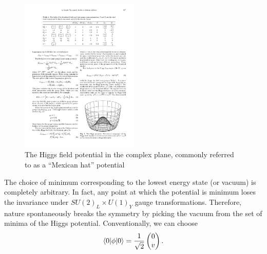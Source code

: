 \begin{figure}[!hbtp]
\centering
\includegraphics[width=0.5\textwidth]{Higgs_potential}
\caption[The Higgs field potential]{The Higgs field potential in the complex plane, commonly referred to as a
``Mexican hat'' potential \autocite{top_quark_at_HC}}
\label{fig:higgs_potential}
\end{figure}

The choice of minimum corresponding to the lowest energy state (or vacuum) is completely arbitrary. In fact, any point
at which the potential is minimum loses the invariance under $SU(2)_L \times U(1)_Y$ gauge transformations. Therefore,
nature spontaneously breaks the symmetry by picking the vacuum from the set of minima of the Higgs potential.
Conventionally, we can choose
\begin{equation}
\langle 0 | \phi | 0 \rangle = \frac{1}{\sqrt{2}} \begin{pmatrix} 0 \\ v \end{pmatrix}.
\label{eq:unitary_gauge_vev}
\end{equation}


